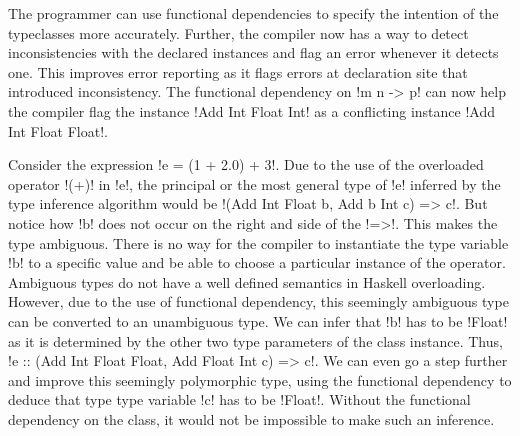 \documentclass[format=acmsmall,manuscript,review,screen,nonacm,margin=1in,11pt]{acmart}
\begin{document}
The programmer can use functional dependencies to specify the intention of the typeclasses
more accurately. Further, the compiler now has a way to detect inconsistencies with
the declared instances and flag an error whenever it detects one.
This improves error reporting as it flags errors at declaration site that introduced inconsistency.
The functional dependency on !m n -> p! can now help the compiler flag
the instance !Add Int Float Int! as a conflicting instance
!Add Int Float Float!.%

Consider the expression !e = (1 + 2.0) + 3!. Due to the use of the overloaded operator !(+)! in !e!,
the principal or the most general type of !e! inferred by the type inference algorithm would be
!(Add Int Float b, Add b Int c) => c!. But notice how !b! does not occur on the right and
side of the !=>!. This makes the type ambiguous. There is no way for the compiler
to instantiate the type variable !b! to a specific value and
be able to choose a particular instance of the operator. Ambiguous types do not have
a well defined semantics in Haskell overloading. However, due to the use of functional dependency,
this seemingly ambiguous type can be converted to an unambiguous type.
We can infer that !b! has to be !Float! as it is determined by the other two type parameters of the class instance.
Thus, !e :: (Add Int Float Float, Add Float Int c) => c!.
We can even go a step further and improve this seemingly polymorphic type, using the functional dependency
to deduce that type type variable !c! has to be !Float!.
Without the functional dependency on the class, it would not be impossible
to make such an inference.
\end{document}
